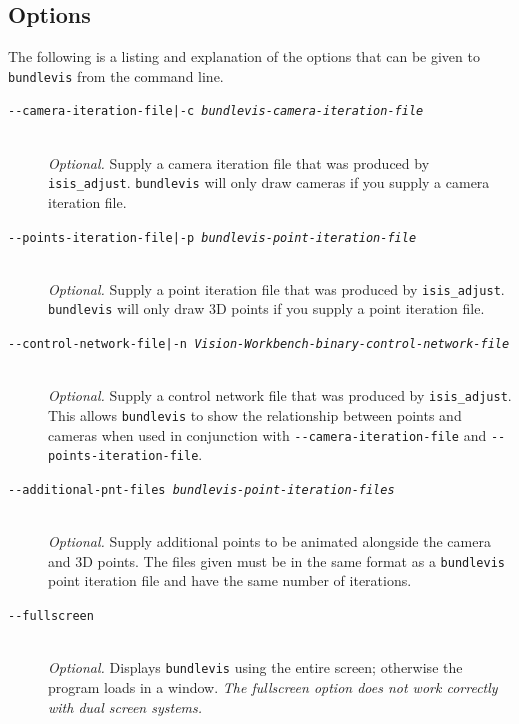 \subsection{Options}

The following is a listing and explanation of the options
that can be given to \texttt{bundlevis} from the command line.

\begin{description}

\item[\texttt{-\/-camera-iteration-file|-c \textit{bundlevis-camera-iteration-file}}] \hfill \\
  \emph{Optional.} Supply a camera iteration file that was produced by
       \texttt{isis\_adjust}.  \texttt{bundlevis} will only draw cameras
       if you supply a camera iteration file.

\item[\texttt{-\/-points-iteration-file|-p \textit{bundlevis-point-iteration-file}}] \hfill \\
  \emph{Optional.} Supply a point iteration file that was produced by
       \texttt{isis\_adjust}.  \texttt{bundlevis} will only draw 3D points
       if you supply a point iteration file.

\item[\texttt{-\/-control-network-file|-n \textit{Vision-Workbench-binary-control-network-file}}] \hfill \\
  \emph{Optional.} Supply a control network file that was produced by
       {\tt isis\_adjust}.  This allows {\tt bundlevis} to show the
       relationship between points and cameras when used in
       conjunction with \texttt{-\/-camera-iteration-file} and
       \texttt{-\/-points-iteration-file}.

\item[\texttt{-\/-additional-pnt-files \textit{bundlevis-point-iteration-files}}] \hfill \\
  \emph{Optional.} Supply additional points to be animated alongside
  the camera and 3D points.  The files given must be in the same
  format as a \texttt{bundlevis} point iteration file and have the same number
  of iterations.

\item[\texttt{-\/-fullscreen}] \hfill \\
  \emph{Optional.} Displays \texttt{bundlevis} using the entire screen;
  otherwise the program loads in a window. \emph{The fullscreen option
    does not work correctly with dual screen systems.}


\end{description}
